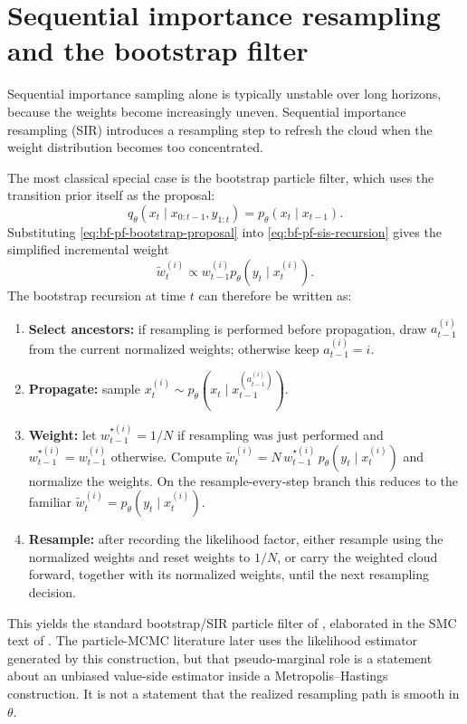 \section{Sequential importance resampling and the bootstrap filter}
\label{sec:bf-pf-sir-bootstrap}

Sequential importance sampling alone is typically unstable over long horizons,
because the weights become increasingly uneven.  Sequential importance
resampling (SIR) introduces a resampling step to refresh the cloud when the
weight distribution becomes too concentrated.

The most classical special case is the bootstrap particle filter, which uses the
transition prior itself as the proposal:
\begin{equation}
\label{eq:bf-pf-bootstrap-proposal}
  q_\theta(x_t \mid x_{0:t-1}, y_{1:t})
  = p_\theta(x_t \mid x_{t-1}).
\end{equation}
Substituting \eqref{eq:bf-pf-bootstrap-proposal} into
\eqref{eq:bf-pf-sis-recursion} gives the simplified incremental weight
\begin{equation}
\label{eq:bf-pf-bootstrap-weight}
  \tilde w_t^{(i)}
  \propto w_{t-1}^{(i)} p_\theta(y_t \mid x_t^{(i)}).
\end{equation}
The bootstrap recursion at time $t$ can therefore be written as:
\begin{enumerate}[label=\textbf{Step \arabic*:}]
  \item \textbf{Select ancestors:}
    if resampling is performed before propagation, draw $a_{t-1}^{(i)}$ from
    the current normalized weights; otherwise keep $a_{t-1}^{(i)}=i$.
  \item \textbf{Propagate:}
    sample
    $x_t^{(i)} \sim p_\theta(x_t \mid x_{t-1}^{(a_{t-1}^{(i)})})$.
  \item \textbf{Weight:}
    let $w_{t-1}^{\star(i)} = 1/N$ if resampling was just performed and
    $w_{t-1}^{\star(i)} = w_{t-1}^{(i)}$ otherwise.  Compute
    $\tilde w_t^{(i)} = N\,w_{t-1}^{\star(i)}\,p_\theta(y_t \mid x_t^{(i)})$
    and normalize the weights.  On the resample-every-step branch this reduces
    to the familiar $\tilde w_t^{(i)} = p_\theta(y_t \mid x_t^{(i)})$.
  \item \textbf{Resample:}
    after recording the likelihood factor, either resample using the normalized
    weights and reset weights to $1/N$, or carry the weighted cloud forward,
    together with its normalized weights, until the next resampling decision.
\end{enumerate}
This yields the standard bootstrap/SIR particle filter of
\citet{gordon1993novel}, elaborated in the SMC text of
\citet{doucet2001sequential}.  The particle-MCMC literature
\citep{andrieu2009pseudo,andrieu2010particle} later uses the likelihood
estimator generated by this construction, but that pseudo-marginal role is a
statement about an unbiased value-side estimator inside a Metropolis--Hastings
construction.  It is not a statement that the realized resampling path is
smooth in $\theta$.

